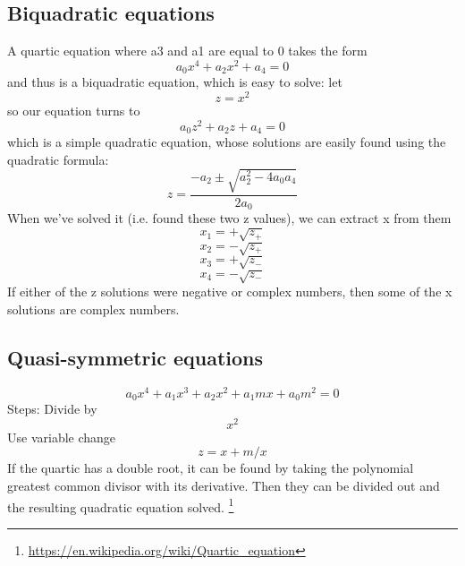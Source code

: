 \subsection{Biquadratic equations}
A quartic equation where a3 and a1 are equal to 0 takes the form
\begin{equation}
    a_{0}x^{4}+a_{2}x^{2}+a_{4}=0
\end{equation}
and thus is a biquadratic equation, which is easy to solve: let 
\begin{equation}
    z=x^{2}
\end{equation}
so our equation turns to
\begin{equation}
    a_{0}z^{2}+a_{2}z+a_{4}=0
\end{equation}
which is a simple quadratic equation, whose solutions are easily found using the quadratic formula:
\begin{equation}
    z={\frac {-a_{2}\pm {\sqrt {a_{2}^{2}-4a_{0}a_{4}}}}{2a_{0}}}
\end{equation}
When we've solved it (i.e. found these two z values), we can extract x from them
\begin{equation}
    {x_{1}=+{\sqrt {z_{+}}}}
\end{equation}
\begin{equation}
    {x_{2}=-{\sqrt {z_{+}}}}
\end{equation}
\begin{equation}
    {x_{3}=+{\sqrt {z_{-}}}}
\end{equation}
\begin{equation}
      {x_{4}=-{\sqrt {z_{-}}}}
\end{equation}
If either of the z solutions were negative or complex numbers, then some of the x solutions are complex numbers.
\subsection{Quasi-symmetric equations}
\begin{equation}
    a_{0}x^{4}+a_{1}x^{3}+a_{2}x^{2}+a_{1}mx+a_{0}m^{2}=0
\end{equation}
Steps:
Divide by \begin{equation}
    x^2
\end{equation}
Use variable change\begin{equation}
    z = x + m/x
\end{equation}
If the quartic has a double root, it can be found by taking the polynomial greatest common divisor with its derivative. Then they can be divided out and the resulting quadratic equation solved.
\footnote{\url{https://en.wikipedia.org/wiki/Quartic_equation}}

